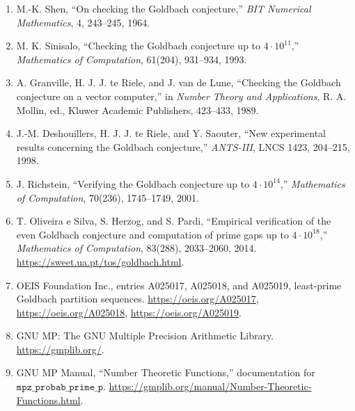 \documentclass[11pt]{article}
\begin{document}
\small
\begin{enumerate}
\setlength{\itemsep}{0pt}
\setlength{\parskip}{0pt}
\item\label{ref:shen} M.-K. Shen, ``On checking the Goldbach conjecture,'' \emph{BIT
Numerical Mathematics}, 4, 243--245, 1964.
\item\label{ref:sinisalo} M. K. Sinisalo, ``Checking the Goldbach conjecture up to
\(4\cdot10^{11}\),'' \emph{Mathematics of Computation}, 61(204), 931--934,
1993.
\item\label{ref:granville} A. Granville, H. J. J. te Riele, and J. van de Lune,
``Checking the Goldbach conjecture on a vector computer,'' in
\emph{Number Theory and Applications}, R. A. Mollin, ed., Kluwer Academic
Publishers, 423--433, 1989.
\item\label{ref:deshouillers} J.-M. Deshouillers, H. J. J. te Riele, and Y. Saouter, ``New
experimental results concerning the Goldbach conjecture,'' \emph{ANTS-III},
LNCS 1423, 204--215, 1998.
\item\label{ref:richstein} J. Richstein, ``Verifying the Goldbach conjecture up to
\(4\cdot10^{14}\),'' \emph{Mathematics of Computation}, 70(236),
1745--1749, 2001.
\item\label{ref:oliveira} T. Oliveira e Silva, S. Herzog, and S. Pardi, ``Empirical verification
of the even Goldbach conjecture and computation of prime gaps up to
\(4\cdot10^{18}\),'' \emph{Mathematics of Computation}, 83(288), 2033--2060,
2014. \url{https://sweet.ua.pt/tos/goldbach.html}.
\item\label{ref:oeis} OEIS Foundation Inc., entries A025017, A025018, and
A025019, least-prime Goldbach partition sequences.
\url{https://oeis.org/A025017}, \url{https://oeis.org/A025018},
\url{https://oeis.org/A025019}.
\item\label{ref:gmp} GNU MP: The GNU Multiple Precision Arithmetic Library.
\url{https://gmplib.org/}.
\item\label{ref:gmpmanual} GNU MP Manual, ``Number Theoretic Functions,''
documentation for \(\texttt{mpz\_probab\_prime\_p}\).
\url{https://gmplib.org/manual/Number-Theoretic-Functions.html}.
\end{enumerate}
\end{document}
